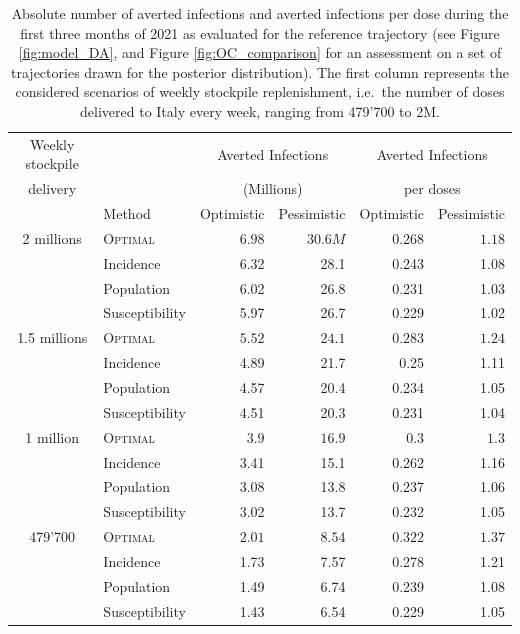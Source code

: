 \begin{table}[h!]
\centering
\begin{tabular}{clrrrr}
\toprule
Weekly stockpile& {} & \multicolumn{2}{c}{Averted Infections} & \multicolumn{2}{c}{Averted Infections} \\
delivery&  {}  &\multicolumn{2}{c}{(Millions)} & \multicolumn{2}{c}{ per doses} \\
& Method &  Optimistic & Pessimistic &     Optimistic & Pessimistic \\
\midrule
2 millions & \textsc{Optimal} &   $6.98$ &  $30.6M$ & $0.268$ & $1.18$ \\
        & Incidence &   6.32 &    28.1 &          0.243 &        1.08 \\
        & Population &   6.02 &    26.8 &          0.231 &        1.03 \\
        & Susceptibility &   5.97 &    26.7 &          0.229 &        1.02 \\
1.5 millions & \textsc{Optimal} &   $5.52$ &   $24.1$ &  $ 0.283$ & $1.24$ \\
        & Incidence &   4.89 &    21.7 &           0.25 &        1.11 \\
        & Population &   4.57 &    20.4 &          0.234 &        1.05 \\
        & Susceptibility &   4.51 &    20.3 &          0.231 &        1.04 \\
1 million & \textsc{Optimal} &    $3.9$ &    $16.9$ &  $0.3$ & $1.3$ \\
        & Incidence &   3.41 &    15.1 &          0.262 &        1.16 \\
        & Population &   3.08 &    13.8 &          0.237 &        1.06 \\
        & Susceptibility &   3.02 &    13.7 &          0.232 &        1.05 \\
479'700 & \textsc{Optimal} &  $2.01$ &  $8.54$ & $0.322$ & $1.37$ \\
        & Incidence &   1.73 &    7.57 &          0.278 &        1.21 \\
        & Population &   1.49 &    6.74 &          0.239 &        1.08 \\
        & Susceptibility &   1.43 &    6.54 &          0.229 &        1.05 \\
\bottomrule
\end{tabular}
\caption[Averted infections per dose for different allocation strategies]{Absolute number of averted infections and averted infections per dose during the first three months of 2021 as evaluated for the reference trajectory (see Figure \ref{fig:model_DA}, and Figure \ref{fig:OC_comparison} for an assessment on a set of trajectories drawn for the posterior distribution). The first column represents the considered scenarios of weekly stockpile replenishment, i.e.~the number of doses delivered to Italy every week, ranging from 479'700 to 2M.}
\label{table:averted_abs}
\end{table}

